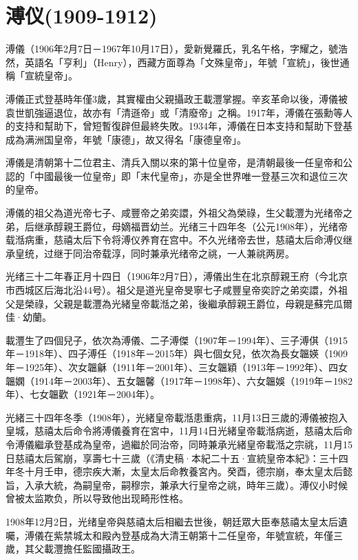 
\section{溥仪\tiny(1909-1912)}

溥儀（1906年2月7日－1967年10月17日），愛新覺羅氏，乳名午格，字耀之，號浩然，英語名「亨利」（Henry），西藏方面尊為「文殊皇帝」，年號「宣統」，後世通稱「宣統皇帝」。

溥儀正式登基時年僅3歲，其實權由父親攝政王載灃掌握。辛亥革命以後，溥儀被袁世凱強逼退位，故亦有「清遜帝」或「清廢帝」之稱。1917年，溥儀在張勳等人的支持和幫助下，曾短暫復辟但最終失敗。1934年，溥儀在日本支持和幫助下登基成為满洲国皇帝，年號「康德」，故又得名「康德皇帝」。

溥儀是清朝第十二位君主、清兵入關以來的第十位皇帝，是清朝最後一任皇帝和公認的「中國最後一位皇帝」即「末代皇帝」，亦是全世界唯一登基三次和退位三次的皇帝。

溥儀的祖父為道光帝七子、咸豐帝之弟奕譞，外祖父為榮祿，生父載灃为光绪帝之弟，后继承醇親王爵位，母嫡福晋幼兰。光绪三十四年冬（公元1908年），光绪帝载湉病重，慈禧太后下令将溥仪养育在宫中。不久光绪帝去世，慈禧太后命溥仪继承皇统，过继于同治帝载淳，同时兼承光绪帝之祧，一人兼祧两房。

光绪三十二年春正月十四日（1906年2月7日），溥儀出生在北京醇親王府（今北京市西城区后海北沿44号）。祖父是道光皇帝旻寧七子咸豐皇帝奕詝之弟奕譞，外祖父是榮祿，父親是載灃為光緒皇帝載湉之弟，後繼承醇親王爵位，母親是蘇完瓜爾佳·幼蘭。

載灃生了四個兒子，依次為溥儀、二子溥傑（1907年－1994年）、三子溥倛（1915年－1918年）、四子溥任（1918年－2015年）與七個女兒，依次為長女韞媖（1909年－1925年）、次女韞龢（1911年－2001年）、三女韞穎（1913年－1992年）、四女韞嫻（1914年－2003年）、五女韞馨（1917年－1998年）、六女韞娛（1919年－1982年）、七女韞歡（1921年－2004年）。

光緒三十四年冬季（1908年），光緒皇帝載湉患重病，11月13日三歲的溥儀被抱入皇城，慈禧太后命令將溥儀養育在宮中，11月14日光緒皇帝載湉病逝，慈禧太后命令溥儀繼承登基成為皇帝，過繼於同治帝，同時兼承光緒皇帝載湉之宗祧，11月15日慈禧太后駕崩，享壽七十三歲（《清史稿·本紀二十五·宣統皇帝本紀》：三十四年冬十月壬申，德宗疾大漸，太皇太后命教養宮內。癸酉，德宗崩，奉太皇太后懿旨，入承大統，為嗣皇帝，嗣穆宗，兼承大行皇帝之祧，時年三歲）。溥仪小时候曾被太监欺负，所以导致他出现畸形性格。

1908年12月2日，光绪皇帝與慈禧太后相繼去世後，朝廷眾大臣奉慈禧太皇太后遺囑，溥儀在紫禁城太和殿內登基成為大清王朝第十二任皇帝，年號宣統，年僅三歲，其父載灃擔任監國攝政王。

